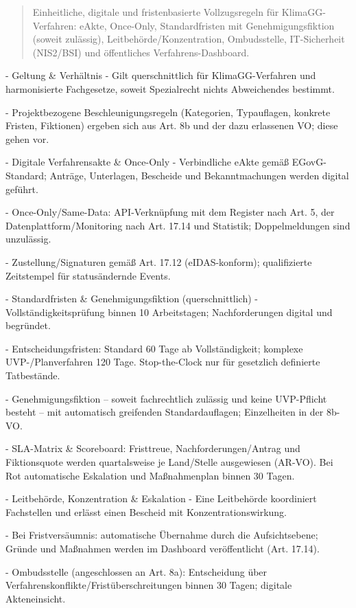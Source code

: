 \documentclass[12pt,a4paper]{scrartcl}
\begin{document}
\begin{quote}
Einheitliche, digitale und fristenbasierte Vollzugsregeln für KlimaGG-Verfahren: eAkte, Once-Only, Standardfristen mit Genehmigungsfiktion (soweit zulässig), Leitbehörde/Konzentration, Ombudsstelle, IT-Sicherheit (NIS2/BSI) und öffentliches Verfahrens-Dashboard.
\end{quote}

- Geltung \& Verhältnis
- Gilt querschnittlich für KlimaGG-Verfahren und harmonisierte Fachgesetze, soweit Spezialrecht nichts Abweichendes bestimmt.

- Projektbezogene Beschleunigungsregeln (Kategorien, Typauflagen, konkrete Fristen, Fiktionen) ergeben sich aus Art. 8b und der dazu erlassenen VO; diese gehen vor.

- Digitale Verfahrensakte \& Once-Only
- Verbindliche eAkte gemäß EGovG-Standard; Anträge, Unterlagen, Bescheide und Bekanntmachungen werden digital geführt.

- Once-Only/Same-Data: API-Verknüpfung mit dem Register nach Art. 5, der Datenplattform/Monitoring nach Art. 17.14 und Statistik; Doppelmeldungen sind unzulässig.

- Zustellung/Signaturen gemäß Art. 17.12 (eIDAS-konform); qualifizierte Zeitstempel für statusändernde Events.

- Standardfristen \& Genehmigungsfiktion (querschnittlich)
- Vollständigkeitsprüfung binnen 10 Arbeitstagen; Nachforderungen digital und begründet.

- Entscheidungsfristen: Standard 60 Tage ab Vollständigkeit; komplexe UVP-/Planverfahren 120 Tage. Stop-the-Clock nur für gesetzlich definierte Tatbestände.

- Genehmigungsfiktion -- soweit fachrechtlich zulässig und keine UVP-Pflicht besteht -- mit automatisch greifenden Standardauflagen; Einzelheiten in der 8b-VO.

- SLA-Matrix \& Scoreboard: Fristtreue, Nachforderungen/Antrag und Fiktionsquote werden quartalsweise je Land/Stelle ausgewiesen (AR-VO). Bei Rot automatische Eskalation und Maßnahmenplan binnen 30 Tagen.

- Leitbehörde, Konzentration \& Eskalation
- Eine Leitbehörde koordiniert Fachstellen und erlässt einen Bescheid mit Konzentrationswirkung.

- Bei Fristversäumnis: automatische Übernahme durch die Aufsichtsebene; Gründe und Maßnahmen werden im Dashboard veröffentlicht (Art. 17.14).

- Ombudsstelle (angeschlossen an Art. 8a): Entscheidung über Verfahrenskonflikte/Fristüberschreitungen binnen 30 Tagen; digitale Akteneinsicht.
\end{document}
